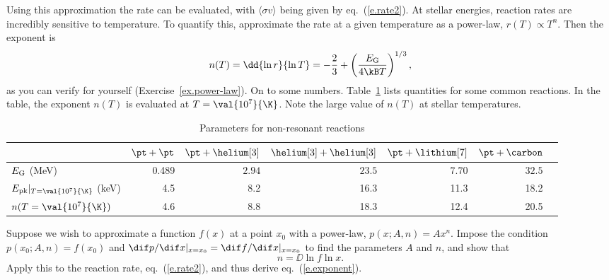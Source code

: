 Using this approximation the rate can be evaluated, with $\langle\sigma v\rangle$ being given by eq.~(\ref{e.rate2}).
At stellar energies, reaction rates are incredibly sensitive to temperature. To quantify this, approximate the rate at a given temperature as a power-law, $r(T)\propto T^{n}$. Then the exponent is
\begin{equation}\label{e.exponent}
 n(T) = \dd{\ln r}{\ln T} = -\frac{2}{3} + \left(\frac{\EG}{4\kB T}\right)^{1/3},
\end{equation}
as you can verify for yourself (Exercise~\ref{ex.power-law}). On to some numbers. Table~\ref{t.reaction} lists quantities for some common reactions. 
In the table, the exponent $n(T)$ is evaluated at $T = \val{10^{7}}{\K}$. Note the large value of $n(T)$ at stellar temperatures. 
 
\begin{table}[hb]
\caption{\label{t.reaction} Parameters for non-resonant reactions}
\begin{tabular}{lrrrrrr}
 & $\pt+\pt$ & $\pt+\helium[3]$ & $\helium[3]+\helium[3]$ & $\pt+\lithium[7]$ & $\pt+\carbon$\\
\hline
$E_{\mathrm{G}}$ (MeV) & 0.489 & $2.94$ & $23.5$ & $7.70$ & $32.5$\\
$\Epk|_{T=\val{10^{7}}{\K}}$ (keV) & 4.5 & 8.2 & 16.3 & 11.3 & 18.2\\
$n(T = \val{10^{7}}{\K})$ & 4.6 & 8.8 & 18.3 & 12.4 & 20.5\\
\end{tabular}
\end{table}

\begin{exercisebox}
\label{ex.power-law}
Suppose we wish to approximate a function $f(x)$ at a point $x_{0}$ with a power-law, $p(x;A,n) = Ax^{n}$. Impose the condition $p(x_{0};A,n) = f(x_{0})$ and $\dif p/\dif x |_{x=x_{0}} = \dif f/\dif x|_{x=x_{0}}$ to find the parameters $A$ and $n$, and show that
\[
	n = \DD{\ln f}{\ln x}.
\]
Apply this to the reaction rate, eq.~(\ref{e.rate2}), and thus derive eq.~(\ref{e.exponent}).
\end{exercisebox}

